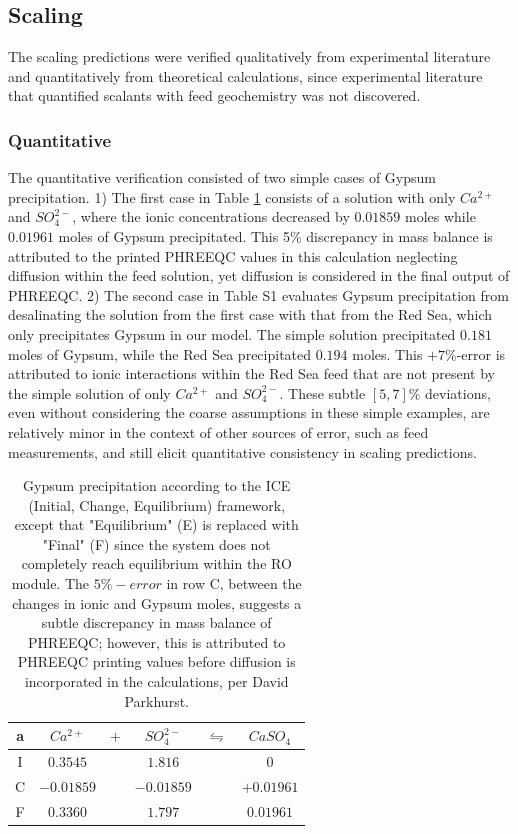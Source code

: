 \subsection{Scaling}
The scaling predictions were verified qualitatively from experimental literature and quantitatively from theoretical calculations, since experimental literature that quantified scalants with feed geochemistry was not discovered.

\subsubsection{Quantitative}
The quantitative verification consisted of two simple cases of Gypsum precipitation. 1) The first case in Table \ref{gypsum_ice_table} consists of a solution with only $Ca^{2+}$ and $SO_4^{2-}$, where the ionic concentrations decreased by $0.01859$ moles while $0.01961$ moles of Gypsum precipitated. This 5\% discrepancy in mass balance is attributed to the printed PHREEQC values in this calculation neglecting diffusion within the feed solution, yet diffusion is considered in the final output of PHREEQC. 2) The second case in Table S1 evaluates Gypsum precipitation from desalinating the solution from the first case with that from the Red Sea, which only precipitates Gypsum in our model. The simple solution precipitated $0.181$ moles of Gypsum, while the Red Sea precipitated $0.194$ moles. This $+7\%$-error is attributed to ionic interactions within the Red Sea feed that are not present by the simple solution of only $Ca^{2+}$ and $SO_4^{2-}$. These subtle $[5,7]\%$ deviations, even without considering the coarse assumptions in these simple examples, are relatively minor in the context of other sources of error, such as feed measurements, and still elicit quantitative consistency in scaling predictions.

\begin{table}
    \centering
    \begin{tabular}{c|ccccc}
      \toprule
      \textbf{a} & $Ca^{2+}$ & $+$ & $SO_4^{2-}$ & $\leftrightharpoons$ & $CaSO_4$ \\
      \midrule
      I & $0.3545$ && $1.816$ && $0$ \\
      C & $-0.01859$ && $-0.01859$ && $+0.01961$ \\
      F & $0.3360$ && $1.797$ && $0.01961$ \\
      \bottomrule
    \end{tabular}
    \caption{
        Gypsum precipitation according to the ICE (Initial, Change, Equilibrium) framework, except that "Equilibrium" (E) is replaced with "Final" (F) since the system does not completely reach equilibrium within the RO module. The $5\%-error$ in row C, between the changes in ionic and Gypsum moles, suggests a subtle discrepancy in mass balance of PHREEQC; however, this is attributed to PHREEQC printing values before diffusion is incorporated in the calculations, per David Parkhurst. 
      }
    \label{gypsum_ice_table}
\end{table}

